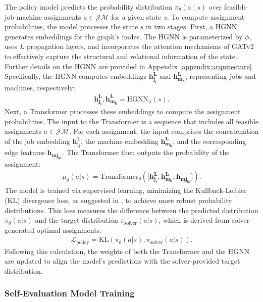 The policy model predicts the probability distribution $\pi_\theta(a \mid s)$ over feasible job-machine assignments $a \in \mathcal{JM}$ for a given state $s$. To compute assignment probabilities, the model processes the state $s$ in two stages. First, a HGNN generates embeddings for the graph’s nodes. The HGNN is parameterized by $\phi$, uses $L$ propagation layers, and incorporates the attention mechanisms of GATv2 \cite{brody2021attentive} to effectively capture the structural and relational information of the state. Further details on the HGNN are provided in Appendix \ref{appendix:arquitecture}. Specifically, the HGNN computes embeddings $\boldsymbol{h_{j_{i}}^L}$ and $\boldsymbol{h_{m_{k}}^L}$, representing jobs and machines, respectively:
\begin{align}
\boldsymbol{h_{j_{i}}^L}, \boldsymbol{h_{m_{k}}^L} = \text{HGNN}_{\phi}(s).
\end{align}
Next, a Transformer processes these embeddings to compute the assignment probabilities. The input to the Transformer is a sequence that includes all feasible assignments $a \in \mathcal{JM}$. For each assignment, the input comprises the concatenation of the job embedding $\boldsymbol{h_{j_{i}}^L}$, the machine embedding $\boldsymbol{h_{m_{k}}^L}$, and the corresponding edge features $\boldsymbol{h_{mj_{ki}}}$. The Transformer then outputs the probability of the assignment:
\begin{align}
\mu_\theta(a | s) = \text{Transformer}_{\theta}([\boldsymbol{h_{j_{i}}^L},  \boldsymbol{h_{m_{k}}^L}, \boldsymbol{h_{mj_{ki}}]}).
\end{align}
The model is trained via supervised learning, minimizing the Kullback-Leibler (KL) divergence loss, as suggested in \cite{rusu2015policy}, to achieve more robust probability distributions. This loss measures the difference between the predicted distribution $\pi_\theta(a | s)$ and the target distribution $\pi_\text{solver}(a | s)$, which is derived from solver-generated optimal assignments:
\begin{align}
\mathcal{L}_{\text{policy}} = \text{KL}(\pi_\theta(a | s) , \pi_\text{solver}(a | s)).
\end{align}
Following this calculation, the weights of both the Transformer and the HGNN are updated to align the model’s predictions with the solver-provided target distribution.

\subsubsection{Self-Evaluation Model Training}

